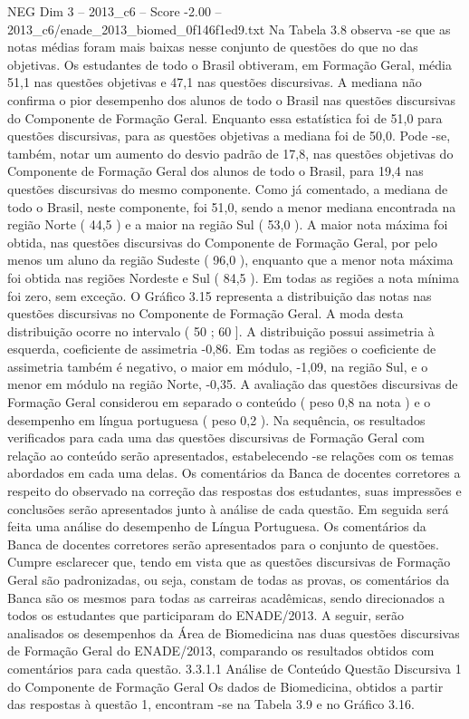 \begin{textsample}{NEG Dim 3 – 2013\_c6 – Score -2.00 – 2013\_c6/enade\_2013\_biomed\_0f146f1ed9.txt}
Na Tabela 3.8 observa -se que as notas médias foram mais baixas nesse conjunto de questões do que no das objetivas.
Os estudantes de todo o Brasil obtiveram, em Formação Geral, média 51,1 nas questões objetivas e 47,1 nas questões discursivas.
A mediana não confirma o pior desempenho dos alunos de todo o Brasil nas questões discursivas do Componente de Formação Geral.
Enquanto essa estatística foi de 51,0 para questões discursivas, para as questões objetivas a mediana foi de 50,0.
Pode -se, também, notar um aumento do desvio padrão de 17,8, nas questões objetivas do Componente de Formação Geral dos alunos de todo o Brasil, para 19,4 nas questões discursivas do mesmo componente.
Como já comentado, a mediana de todo o Brasil, neste componente, foi 51,0, sendo a menor mediana encontrada na região Norte ( 44,5 ) e a maior na região Sul ( 53,0 ).
A maior nota máxima foi obtida, nas questões discursivas do Componente de Formação Geral, por pelo menos um aluno da região Sudeste ( 96,0 ), enquanto que a menor nota máxima foi obtida nas regiões Nordeste e Sul ( 84,5 ).
Em todas as regiões a nota mínima foi zero, sem exceção.
O Gráfico 3.15 representa a distribuição das notas nas questões discursivas no Componente de Formação Geral.
A moda desta distribuição ocorre no intervalo ( 50 ; 60 ].
A distribuição possui assimetria à esquerda, coeficiente de assimetria -0,86.
Em todas as regiões o coeficiente de assimetria também é negativo, o maior em módulo, -1,09, na região Sul, e o menor em módulo na região Norte, -0,35.
A avaliação das questões discursivas de Formação Geral considerou em separado o conteúdo ( peso 0,8 na nota ) e o desempenho em língua portuguesa ( peso 0,2 ).
Na sequência, os resultados verificados para cada uma das questões discursivas de Formação Geral com relação ao conteúdo serão apresentados, estabelecendo -se relações com os temas abordados em cada uma delas.
Os comentários da Banca de docentes corretores a respeito do observado na correção das respostas dos estudantes, suas impressões e conclusões serão apresentados junto à análise de cada questão.
Em seguida será feita uma análise do desempenho de Língua Portuguesa.
Os comentários da Banca de docentes corretores serão apresentados para o conjunto de questões.
Cumpre esclarecer que, tendo em vista que as questões discursivas de Formação Geral são padronizadas, ou seja, constam de todas as provas, os comentários da Banca são os mesmos para todas as carreiras acadêmicas, sendo direcionados a todos os estudantes que participaram do ENADE/2013.
A seguir, serão analisados os desempenhos da Área de Biomedicina nas duas questões discursivas de Formação Geral do ENADE/2013, comparando os resultados obtidos com comentários para cada questão. 3.3.1.1 Análise de Conteúdo Questão Discursiva 1 do Componente de Formação Geral Os dados de Biomedicina, obtidos a partir das respostas à questão 1, encontram -se na Tabela 3.9 e no Gráfico 3.16.

\end{textsample}
